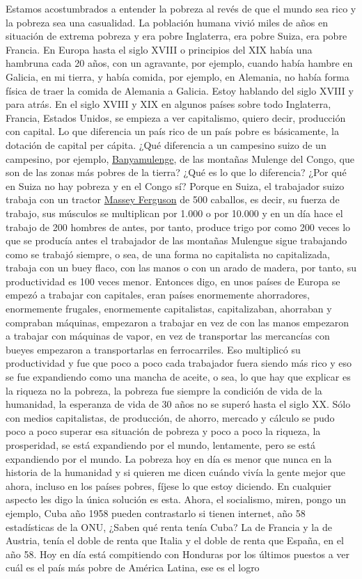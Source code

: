 Estamos acostumbrados a entender la pobreza al revés de que el mundo sea rico y la pobreza sea una casualidad. La población humana vivió miles de años en situación de extrema pobreza y era pobre Inglaterra, era pobre Suiza, era pobre Francia. En Europa hasta el siglo XVIII o principios del XIX había una hambruna cada 20 años, con un agravante, por ejemplo, cuando había hambre en Galicia, en mi tierra, y había comida, por ejemplo, en Alemania, no había forma física de traer la comida de Alemania a Galicia. Estoy hablando del siglo XVIII y para atrás. En el siglo XVIII y XIX en algunos países sobre todo Inglaterra, Francia, Estados Unidos, se empieza a ver capitalismo, quiero decir, producción con capital. Lo que diferencia un país rico de un país pobre es básicamente, la dotación de capital per cápita. ¿Qué diferencia a un campesino suizo de un campesino, por ejemplo, \href{https://en.wikipedia.org/wiki/Banyamulenge}{Banyamulenge}, de las montañas Mulenge del Congo, que son de las zonas más pobres de la tierra? ¿Qué es lo que lo diferencia? ¿Por qué en Suiza no hay pobreza y en el Congo sí? Porque en Suiza, el trabajador suizo trabaja con un tractor \href{https://en.wikipedia.org/wiki/Massey_Ferguson}{Massey Ferguson} de 500 caballos, es decir, su fuerza de trabajo, sus músculos se multiplican por 1.000 o por 10.000 y en un día hace el trabajo de 200 hombres de antes, por tanto, produce trigo por como 200 veces lo que se producía antes el trabajador de las montañas Mulengue sigue trabajando como se trabajó siempre, o sea, de una forma no capitalista no capitalizada, trabaja con un buey flaco, con las manos o con un arado de madera, por tanto, su productividad es 100 veces menor. Entonces digo, en unos países de Europa se empezó a trabajar con capitales, eran países enormemente ahorradores, enormemente frugales, enormemente capitalistas, capitalizaban, ahorraban y compraban máquinas, empezaron a trabajar en vez de con las manos empezaron a trabajar con máquinas de vapor, en vez de transportar las mercancías con bueyes empezaron a transportarlas en ferrocarriles. Eso multiplicó su productividad y fue que poco a poco cada trabajador fuera siendo más rico y eso se fue expandiendo como una mancha de aceite, o sea, lo que hay que explicar es la riqueza no la pobreza, la pobreza fue siempre la condición de vida de la humanidad, la esperanza de vida de 30 años no se superó hasta el siglo XX. Sólo con medios capitalistas, de producción, de ahorro, mercado y cálculo se pudo poco a poco superar esa situación de pobreza y poco a poco la riqueza, la prosperidad, se está expandiendo por el mundo, lentamente, pero se está expandiendo por el mundo. La pobreza hoy en día es menor que nunca en la historia de la humanidad y si quieren me dicen cuándo vivía la gente mejor que ahora, incluso en los países pobres, fíjese lo que estoy diciendo. En cualquier aspecto les digo la única solución es esta. Ahora, el socialismo, miren, pongo un ejemplo, Cuba año 1958 pueden contrastarlo si tienen internet, año 58 estadísticas de la ONU, ¿Saben qué renta tenía Cuba? La de Francia y la de Austria, tenía el doble de renta que Italia y el doble de renta que España, en el año 58. Hoy en día está compitiendo con Honduras por los últimos puestos a ver cuál es el país más pobre de América Latina, ese es el logro 